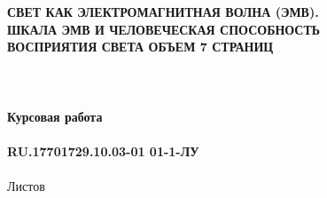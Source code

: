 \documentclass{article}
\begin{document}
\fontsize{14}{16}\selectfont
\thispagestyle{empty}
\clearpage
{}
\bigskip
\begin{center}
\topskip=0pt
\vspace*{\fill}
\textbf{СВЕТ КАК ЭЛЕКТРОМАГНИТНАЯ ВОЛНА (ЭМВ).\\
ШКАЛА ЭМВ И ЧЕЛОВЕЧЕСКАЯ СПОСОБНОСТЬ\\
ВОСПРИЯТИЯ СВЕТА ОБЪЕМ 7 СТРАНИЦ\\
~\\
~\\
~\\
Курсовая работа\\
~\\
RU.17701729.10.03-01 01-1-ЛУ}\\
~\\
Листов \ztotpages\\
\vspace*{\fill}
\end{center}
\begin{center}
\end{center}
\newpage
\tableofcontents
\newpage
\newpage
\end{document}
